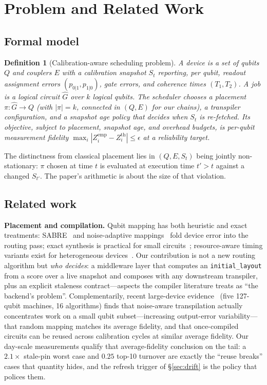 \documentclass[journal,10pt,twocolumn]{IEEEtran}
\newtheorem{definition}{Definition}
\begin{document}
\section{Problem and Related Work}
\subsection{Formal model}
\begin{definition}[Calibration-aware scheduling problem]
A device is a set of qubits $Q$ and couplers $E$ with a calibration snapshot $S_t$ reporting, per qubit, readout
assignment errors $(p_{0|1},p_{1|0})$, gate errors, and coherence times $(T_1,T_2)$. A job is a logical circuit
$\hat{G}$ over $k$ logical qubits. The scheduler chooses a \emph{placement} $\pi:\hat{G}\to Q$ (with
$|\pi|=k$, connected in $(Q,E)$ for our chains), a transpiler configuration, and a \emph{snapshot age policy}
that decides when $S_t$ is re-fetched. Its objective, subject to placement, snapshot age, and overhead budgets, is
per-qubit measurement fidelity $\max_i|Z_i^{\mathrm{emp}}\!\!-\!Z_i^{\mathrm{th}}|\!\le\!\epsilon$ at a
reliability target.
\end{definition}
The distinctness from classical placement lies in $(Q,E,S_t)$ being jointly non-stationary: $\pi$ chosen at time $t$
is evaluated at execution time $t'>t$ against a changed $S_{t'}$. The paper's arithmetic is about the size of that
violation.

\subsection{Related work}
\textbf{Placement and compilation.} Qubit mapping has both heuristic and exact treatments: SABRE~\cite{li2019sabre}
and noise-adaptive mappings~\cite{murali2019noise} fold device error into the routing pass; exact synthesis is
practical for small circuits~\cite{tan2020iccado}; resource-aware timing variants exist for heterogeneous
devices~\cite{lao2022timing}. Our contribution is not a new routing algorithm but \emph{who decides}: a middleware
layer that computes an \texttt{initial\_layout} from a score over a live snapshot and composes with any downstream
transpiler, plus an explicit staleness contract---aspects the compiler literature treats as ``the backend's
problem''. Complementarily, recent large-device evidence~\cite{huowei2025} (five 127-qubit machines, 16 algorithms)
finds that noise-aware transpilation actually concentrates work on a small qubit subset---increasing output-error
variability---that random mapping matches its average fidelity, and that once-compiled circuits can be reused across
calibration cycles at similar average fidelity. Our day-scale measurements qualify that average-fidelity conclusion
on the tail: a $2.1\times$ stale-pin worst case and $0.25$ top-10 turnover are exactly the ``reuse breaks'' cases
that quantity hides, and the refresh trigger of \S\ref{sec:drift} is the policy that polices them.
\end{document}
